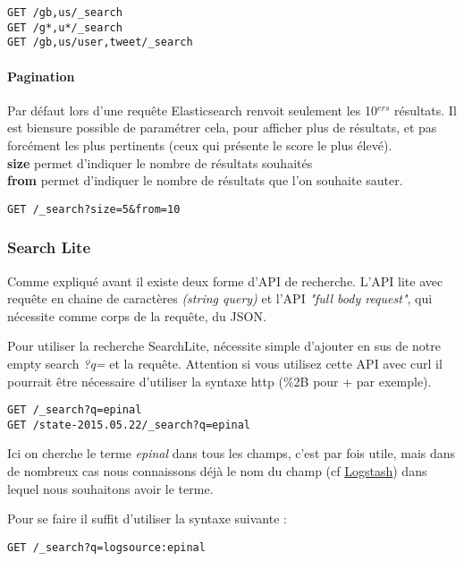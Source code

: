 \begin{lstlisting}[style=code,label={lst:APIsearchemptyexample4},caption={Une recherche multi-index ...}]
GET /gb,us/_search
GET /g*,u*/_search
GET /gb,us/user,tweet/_search
\end{lstlisting}

\paragraph{Pagination}
Par défaut lors d'une requête Elasticsearch renvoit seulement les 10$^{ers}$ résultats.
Il est biensure possible de paramétrer cela, pour afficher plus de résultats, et pas
forcément les plus pertinents (ceux qui présente le score le plus élevé).\\
\textbf{size} permet d'indiquer le nombre de résultats souhaités\\
\textbf{from} permet d'indiquer le nombre de résultats que l'on souhaite sauter.

\begin{lstlisting}[style=code,label={lst:APIsearchemptyexample4},caption={Pagination}]
GET /_search?size=5&from=10
\end{lstlisting}


\subsubsection{Search Lite}
Comme expliqué avant il existe deux forme d'API de recherche. L'API lite avec requête
en chaine de caractères \textit{(string query)} et l'API \textit{"full body request"},
qui nécessite comme corps de la requête, du JSON.

Pour utiliser la recherche SearchLite, nécessite simple d'ajouter en sus de notre
empty search \emph{?q=} et la requête. Attention si vous utilisez cette API avec 
curl il pourrait être nécessaire d'utiliser la syntaxe http (\%2B pour + par exemple).

\begin{lstlisting}[style=code,label={lst:APIsearchliteexample1},caption={Exemples simples}]
GET /_search?q=epinal
GET /state-2015.05.22/_search?q=epinal
\end{lstlisting}

Ici on cherche le terme \emph{epinal} dans tous les champs, c'est par fois utile,
mais dans de nombreux cas nous connaissons déjà le nom du champ (cf \hyperref[lst:grokregex1]{Logstash}) dans
lequel nous souhaitons avoir le terme. 

Pour se faire il suffit d'utiliser la syntaxe suivante : 
\begin{lstlisting}[style=code,label={lst:APIsearchliteexample2},caption={Choix du champ}]
GET /_search?q=logsource:epinal
\end{lstlisting}

